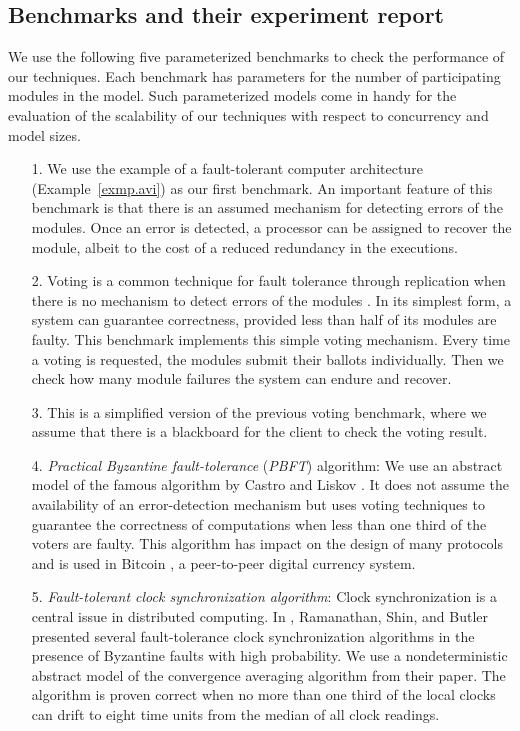 \subsection{Benchmarks and their experiment report}
We use the following five parameterized benchmarks to check the performance of our techniques. 
Each benchmark has parameters for the number of participating modules in the model.  
Such parameterized models come in handy for the evaluation of the scalability of our techniques with respect to concurrency and model sizes.  
\begin{itemize} 
\item[1.] We use the example of a fault-tolerant computer architecture 
  (Example~\ref{exmp.avi}) as our first benchmark.  
  An important feature of this benchmark is that there is an 
  assumed mechanism for detecting errors of the modules.  
  Once an error is detected, a processor can be assigned to recover the 
  module, albeit to the cost of a reduced redundancy in the executions.
\item[2.]
	Voting is a common technique for fault tolerance through 
  replication when there is no mechanism to detect errors of the 
  modules \cite{Pradhan96}.  
  In its simplest form, a system can guarantee correctness, provided less than half of its modules are faulty.   
  This benchmark implements this simple voting mechanism.  
  Every time a voting is requested, the modules submit their ballots individually.  
  Then we check how many module failures the system can endure and recover. 
\item[3.] This is a simplified version of the previous voting benchmark, where we assume that there is a blackboard 
  for the client to check the voting result.  
\item[4.] {\em Practical Byzantine fault-tolerance} ({\em PBFT}) algorithm: 
  We use an abstract model of the famous algorithm by 
  Castro and Liskov \cite{CL99}. 
  It does not assume the availability of an error-detection 
  mechanism but uses 
  voting techniques to guarantee the correctness of 
  computations when less than one third of the voters are faulty.  
  This algorithm has impact on the design of many protocols 
  \cite{AGGRW05,CMLRS06,KADCW09,GKVQ10,CWADM09} and is used in 
  Bitcoin \cite{bitcoin}, a peer-to-peer digital currency system.  
\item[5.] {\em Fault-tolerant clock synchronization algorithm}: 
  Clock synchronization is a central issue in distributed computing. 
  In \cite{RSB90}, 
  Ramanathan, Shin, and Butler presented 
  several fault-tolerance clock synchronization algorithms 
  in the presence of Byzantine faults with high probability.  
  We use a nondeterministic abstract model of the convergence averaging 
  algorithm from their paper.  
  The algorithm is proven correct when no more than one third of the 
  local clocks can drift to eight time units from the median of all clock 
  readings.  
\end{itemize}

